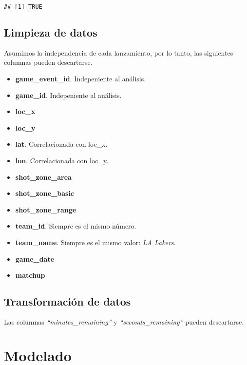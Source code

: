\documentclass[
]{article}
\providecommand{\tightlist}{%
  \setlength{\itemsep}{0pt}\setlength{\parskip}{0pt}}
\begin{document}
\begin{verbatim}
## [1] TRUE
\end{verbatim}

\hypertarget{limpieza-de-datos}{%
\subsection{\texorpdfstring{\textbf{Limpieza de
datos}}{Limpieza de datos}}\label{limpieza-de-datos}}

Asumimos la independencia de cada lanzamiento, por lo tanto, las
siguientes columnas pueden descartarse.

\begin{itemize}
\tightlist
\item
  \textbf{game\_event\_id}. Indepeniente al análisis.
\item
  \textbf{game\_id}. Indepeniente al análisis.
\item
  \textbf{loc\_x}
\item
  \textbf{loc\_y}
\item
  \textbf{lat}. Correlacionada con loc\_x.
\item
  \textbf{lon}. Correlacionada con loc\_y.
\item
  \textbf{shot\_zone\_area}
\item
  \textbf{shot\_zone\_basic}
\item
  \textbf{shot\_zone\_range}
\item
  \textbf{team\_id}. Siempre es el mismo número.
\item
  \textbf{team\_name}. Siempre es el mismo valor: \emph{LA Lakers}.
\item
  \textbf{game\_date}
\item
  \textbf{matchup}
\end{itemize}

\hypertarget{transformaciuxf3n-de-datos}{%
\subsection{\texorpdfstring{\textbf{Transformación de
datos}}{Transformación de datos}}\label{transformaciuxf3n-de-datos}}

Las columnas \emph{``minutes\_remaining''} y
\emph{``seconds\_remaining''} pueden descartarse.

\hypertarget{modelado}{%
\section{\texorpdfstring{\textbf{Modelado}}{Modelado}}\label{modelado}}
\end{document}
